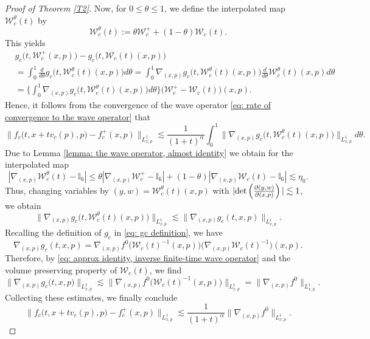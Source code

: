 \documentclass[reqno, 11pt, letterpaper]{amsart}
\theoremstyle{remark}
\numberwithin{equation}{section}
\numberwithin{theorem}{section}
\numberwithin{table}{section}
\numberwithin{figure}{section}
\begin{document}
\begin{proof}[Proof of Theorem \ref{T2}]
Now, for $0\leq\theta\leq 1$, we define the interpolated map $\mathcal{W}_c^\theta(t)$ by 
\begin{equation}
\label{Wtheta}
\mathcal{W}_c^\theta(t):=\theta\mathcal{W}_c^++(1-\theta)\mathcal{W}_c(t).
\end{equation}
This yields
$$\begin{aligned}
&g_c\Big(t,\mathcal{W}_c^+(x,p)\Big)-g_c\Big(t,\mathcal{W}_c(t)(x,p)\Big)\\
&=\int_0^1\frac{d}{d\theta} g_c\Big(t,\mathcal{W}_c^\theta(t)(x,p)\Big)d\theta
=\int_0^1\nabla_{(x,p)}g_c\Big(t,\mathcal{W}_c^\theta(t)(x,p)\Big)\frac{d}{d\theta}\mathcal{W}_c^\theta(t)(x,p) d\theta\\
&=\bigg\{\int_0^1\nabla_{(x,p)}g_c\Big(t,\mathcal{W}_c^\theta(t)(x,p)\Big) d\theta\bigg\} \big(\mathcal{W}_c^+-\mathcal{W}_c(t)\big)(x,p).
\end{aligned}$$
Hence, it follows from the convergence of the wave operator \eqref{eq: rate of convergence to the wave operator} that 
$$\Big\|f_c\Big(t,x+tv_c(p),p\Big)-f_c^+(x,p)\Big\|_{L_{x,p}^1}\lesssim\frac{1}{(1+t)^\alpha}\int_0^1\Big\|\nabla_{(x,p)}g_c\Big(t,\mathcal{W}_c^\theta(t)(x,p)\Big)\Big\|_{L_{x,p}^1} d\theta.$$
Due to Lemma \ref{lemma:  the wave operator, almost identity} we obtain for the interpolated map
\begin{equation}\label{eq: derivative of W theta estimate}
|\nabla_{(x,p)}\mathcal{W}_c^\theta(t)-\mathbb{I}_6|\leq\theta|\nabla_{(x,p)}\mathcal{W}_c^+-\mathbb{I}_6|+(1-\theta)|\nabla_{(x,p)}\mathcal{W}_c(t)-\mathbb{I}_6|\lesssim\eta_0.
\end{equation}
Thus, changing variables by $(y,w)=\mathcal{W}_c^\theta(t)(x,p)$ with $|\textup{det} \left (\frac{\partial (y,w)}{\partial(x,p)} \right )|\lesssim 1$, we obtain 
$$\Big\|\nabla_{(x,p)}g_c\Big(t,\mathcal{W}_c^\theta(t)(x,p)\Big)\Big\|_{L_{x,p}^1}\lesssim\|\nabla_{(x,p)}g_c(t,x,p)\|_{L_{x,p}^1}.$$
Recalling the definition of $g_c$ in \eqref{eq: gc definition}, we have 
$$\nabla_{(x,p)}g_c(t,x,p)=\nabla_{(x,p)}f^0\Big(\mathcal{W}_c(t)^{-1}(x,p)\Big)\big(\nabla_{(x,p)}\mathcal{W}_c(t)^{-1}\Big)(x,p).$$
Therefore, by \eqref{eq: approx identity, inverse finite-time wave operator} and the volume preserving property of $\mathcal{W}_c(t)$, we find 
$$\big\|\nabla_{(x,p)}g_c\big(t,x,p)\big\|_{L_{x,p}^1}\lesssim\Big\|\nabla_{(x,p)}f^0\Big(\mathcal{W}_c(t)^{-1}(x,p)\Big)\Big\|_{L_{x,p}^1}=\|\nabla_{(x,p)}f^0\|_{L_{x,p}^1}.$$
Collecting these estimates, we finally conclude
$$\Big\|f_c\Big(t,x+tv_c(p),p\Big)-f_c^+(x,p)\Big\|_{L_{x,p}^1}\lesssim\frac{1}{(1+t)^\alpha}\|\nabla_{(x,p)}f^0\|_{L_{x,p}^1}.$$
\end{proof}
\end{document}
